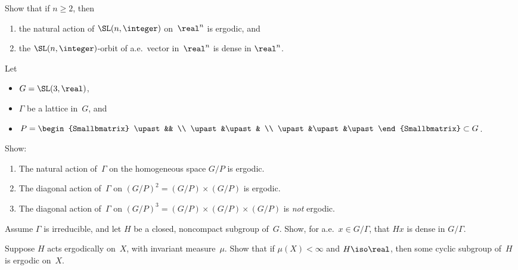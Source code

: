 \begin{exercises}
\item Show that if $n \ge 2$, then
	\begin{enumerate}
	\item the natural action of $\SL(n,\integer)$ on~$\real^n$ is ergodic,
	and
	\item the $\SL(n,\integer)$-orbit of a.e.\ vector in~$\real^n$ is dense in $\real^n$.
	\end{enumerate}

\item
Let 	
	\begin{itemize}
	\item $G = \SL(3,\real)$,
	\item $\Gamma$ be a lattice in~$G$,
	and
	\item $P = \begin{Smallbmatrix} \upast&& \\ \upast&\upast& \\ \upast&\upast&\upast\end{Smallbmatrix} \subset G$.
	\end{itemize}
Show:
\begin{enumerate}
\item The natural action of~$\Gamma$ on the homogeneous space $G/P$ is ergodic.
\item The diagonal action of~$\Gamma$ on $(G/P)^2 = (G/P) \times (G/P)$ is ergodic.
\item The diagonal action of~$\Gamma$ on $(G/P)^3 = (G/P) \times (G/P) \times (G/P)$ is \emph{not} ergodic.
\end{enumerate}

 \item \label{AEOrbitDenseInG/Gamma}
 Assume $\Gamma$ is irreducible, and let $H$ be a closed, noncompact subgroup of~$G$. Show, for a.e.\ $x \in G/\Gamma$, that $Hx$ is dense in $G/\Gamma$.

\item \label{RErgodic->ZErgodic}
Suppose $H$ acts ergodically on~$X$, with invariant measure~$\mu$. 
Show that if $\mu(X) < \infty$ and $H \iso \real$, then some cyclic subgroup of~$H$ is ergodic on~$X$.

\end{exercises}



